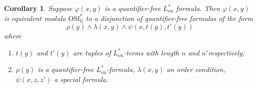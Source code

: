 \documentclass[letterpaper]{amsart}
\newcommand{\qq}{\mathbb{Q}}
\newcommand{\zz}{\mathbb{Z}}
\newcommand{\sU}{\mathscr{U}}
\newcommand{\sP}{\mathscr{P}}
\newcommand{\TSFZ}{\mathrm{SF}^*_{\zz}}
\newcommand{\TSFQ}{\mathrm{SF}^*_{\qq}}
\newcommand{\WSFZ}{\mathrm{Sf}^*_{\zz}}
\newcommand{\WSFQ}{\mathrm{Sf}^*_{\qq}}
\newcommand{\WOSFQ}{\mathrm{OSf}^*_{\qq}}
\newtheorem{cor}[thm]{Corollary}
\begin{document}
\begin{comment}
We further reduce the main statement to the special case where there is $k\neq 0$ such that $k_i =  k'_{i'} =k$ for all $i\in \{1, \ldots, n\}$ and $i' \in \{ 1, \ldots, n'\}$. Choose $k\neq 0 $ to be a common multiple of $k_1, \ldots, k_n$ and $k'_1, \ldots k'_{n'}$. Then by Lemma \ref{basicpropertiesZ}(6) and Lemma \ref{basicpropertiesQ}(3), across models of $\WSFZ$ and models of $\WSFQ$ extending $(G; \sU^G, \sP^G)$, we have that
$$ k_ix+c_i \in P_{m_i}\  \text{ is equivalent to }\ (kx+kk^{-1}_ic_i \in P_{kk^{-1}_im_i}) \text{ for }  i \in \{1, \ldots, n\}. $$
We have a similar observation for $k$ and $k'_{i'}$ with $i' \in \{1, \ldots, n'\}$. The desired reduction easily follows from these observations and the preceding paragraph. 


We can now assume that we are in the special case of the preceding paragraph. Let $k=k_1$. To get the overall conclusion, it suffices to show that across models of $\TSFZ$ and models of $\TSFQ$ extending $(G; \sU^G, \sP^G)$, $$ \xi(x, c, c') \text{ is equivalent to } \bigvee_{j \in J} \psi^{(j)}\big(x, c^{(j)}, c'^{(j)}\big)$$
where $J$ is a finite set and for every $j \in J$,  the components of $c^{(j)}$ and $c'^{(j)}$ are among the components of $c$ and $c'$ and  $\psi^{(j)}\big(x, c^{(j)}, c'^{(j)}\big)$ is a $G$-system.  Let $m$ be a common multiple of $m_1, \ldots, m_n$ and $m'_1, \ldots m'_{n'}$.  By Lemma \ref{basicpropertiesZ}(5, 6) and Lemma \ref{basicpropertiesQ}(3), the following two statements hold across models of $\TSFZ$ and models of $\TSFQ$ extending $(G; \sU^G, \sP^G)$: for $i \in \{ 1, \ldots, n\}$, we have that
$$ kx+c_i \in P_{m_i} \  \text{ is equivalent to  }\ kx+c_i \in P_{m} \wedge \bigwedge_{p \mid \frac{m}{m_i}}  kx+c_i \notin U_{2+ v_p(m_i)} $$
for $i' \in \{ 1, \ldots, n'\}$, we have that
$$ kx+c'_{i'} \notin P_{m'_{i'}} \  \text{ is equivalent to }\ kx+c'_{i'} \notin P_{m} \vee \bigvee_{p \mid \frac{m}{m'_{i'}}} kx+c'_{i'} \in U_{2+ v_p(m'_{i'})} .  $$
The conclusion thus follows.
\end{comment} 
 
\begin{cor}\label{SimplifytoG2}
Suppose $\varphi(x,y)$ is a quantifier-free $L^*_{\mathrm{ou}}$ formula. Then $\varphi(x,y)$ is  equivalent modulo $\WOSFQ$ to a disjunction of quantifier-free formulas of the form
$$  \rho(y) 
\wedge \lambda(x,y) \wedge \psi(x, t(y), t'(y))  $$
where
\begin{enumerate}
\item[$\mathrm{(i)}$] $t(y)$ and $t'(y)$ are tuples of $L^*_{\mathrm{ou}}$-terms with length $n$ and $n'$respectively;
\item[$\mathrm{(ii)}$] $\rho(y)$ is a quantifier-free $L^*_{\mathrm{ou}}$-formula, $ \lambda(x, y)$ an order condition, $\psi(x, z, z')$ a special formula.
\end{enumerate}
\end{cor}
\end{document}
